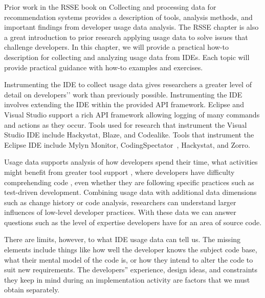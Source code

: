 \documentclass{book}
\begin{document}
Prior work in the RSSE book on Collecting and processing data for recommendation systems provides a description of tools, analysis methods, and important findings from developer usage data analysis.  The RSSE chapter is also a great introduction to prior research applying usage data to solve issues that challenge developers.  In this chapter, we will provide a practical how-to description for collecting and analyzing usage data from IDEs.  Each topic will provide practical guidance with how-to examples and exercises.  

Instrumenting the IDE to collect usage data gives researchers a greater level of detail on developers’' work than previously possible. Instrumenting the IDE involves extending the IDE within the provided API framework.  Eclipse and Visual Studio support a rich API framework allowing logging of many commands and actions  as they occur.  Tools used for research that instrument the Visual Studio IDE include Hackystat\cite{V:johnson2003beyond}, Blaze, and Codealike.  Tools that instrument the Eclipse IDE include Mylyn Monitor, CodingSpectator~\cite{VakilianETAL2012UseDisuseMisuse}, Hackystat\cite{V:johnson2003beyond}, and Zorro\cite{Kou2010Operational}.

Usage data supports analysis of how developers spend their time\cite{V:johnson2003beyond}, what activities might benefit from greater tool support \cite{V:MurphyHill2012How}, where developers have difficulty comprehending code \cite{Carter2010Are}, even whether they are following specific practices such as test-driven development\cite{Kou2010Operational}.  Combining usage data with additional data dimensions such as change history or code analysis, researchers can understand larger influences of low-level developer practices.  With these data we can answer questions such as the level of expertise developers have for an area of source code. \cite{Fritz2010Degreeofknowledge}

There are limits, however, to what IDE usage data can tell us.  The missing elements include things like how well the developer knows the subject code base, what their mental model of the code is, or how they intend to alter the code to suit new requirements.  The developers'' experience, design ideas, and constraints they keep in mind during an implementation activity are factors that we must obtain separately.  
\end{document}
